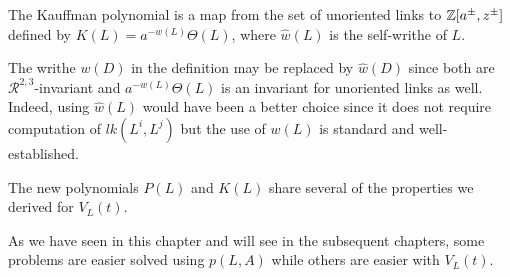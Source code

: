 \begin{definition}
\label{cha:jones-polynomial-21}
The Kauffman polynomial is a map from the set of unoriented links to $\mathbb{Z}[a^{\pm}, z^{\pm}]$ defined by $K(L) = a^{-w(L)} \Theta (L)$, where $\hat{w}(L)$ is the self-writhe of $L$.
\end{definition}

\begin{remark}
The writhe $w(D)$ in the definition may be replaced by $\hat{w}(D)$ since both are $\mathcal{R}^{2,3}$-invariant and $a^{-w(L)} \Theta (L)$ is an invariant for unoriented links as well. Indeed, using $\hat{w}(L)$ would have been a better choice since it does not require computation of $lk(L^i,L^j)$ but the use of $w(L)$ is standard and well-established.
\end{remark}

The new polynomials $P(L)$ and $K(L)$ share several of the properties we derived for $V_L(t)$.

\begin{remark}
  As we have seen in this chapter and will see in the subsequent chapters, some problems are easier solved using $p(L,A)$ while others are easier with $V_L(t)$.
\end{remark}


